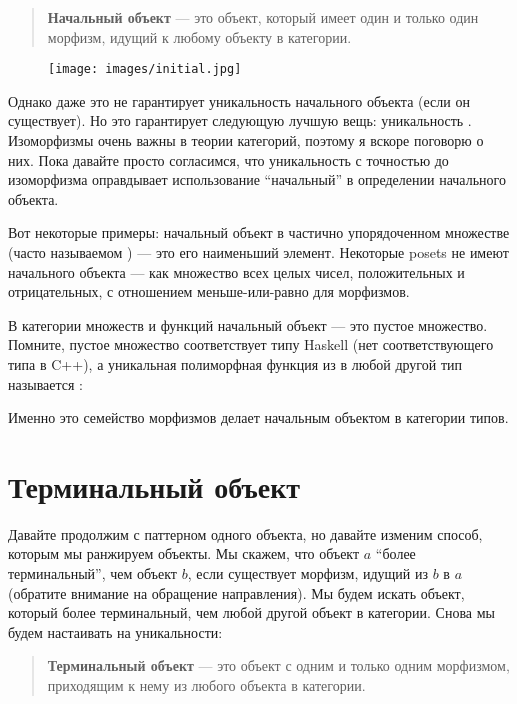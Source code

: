 \begin{quote}
  \textbf{Начальный объект} --- это объект, который имеет один и только один
  морфизм, идущий к любому объекту в категории.
\end{quote}

\begin{figure}[H]
  \centering
  \texttt{[image: images/initial.jpg]}
\end{figure}

\noindent
Однако даже это не гарантирует уникальность начального
объекта (если он существует). Но это гарантирует следующую лучшую вещь:
уникальность . Изоморфизмы очень важны в
теории категорий, поэтому я вскоре поговорю о них. Пока давайте просто
согласимся, что уникальность с точностью до изоморфизма оправдывает использование ``начальный'' в
определении начального объекта.

Вот некоторые примеры: начальный объект в частично упорядоченном множестве
(часто называемом ) --- это его наименьший элемент. Некоторые posets не
имеют начального объекта --- как множество всех целых чисел, положительных и
отрицательных, с отношением меньше-или-равно для морфизмов.

В категории множеств и функций начальный объект --- это пустое
множество. Помните, пустое множество соответствует типу Haskell
 (нет соответствующего типа в C++), а уникальная
полиморфная функция из  в любой другой тип называется
:

Именно это семейство морфизмов делает  начальным
объектом в категории типов.

\section{Терминальный объект}

Давайте продолжим с паттерном одного объекта, но давайте изменим способ,
которым мы ранжируем объекты. Мы скажем, что объект $a$ ``более терминальный'',
чем объект $b$, если существует морфизм, идущий из $b$ в
$a$ (обратите внимание на обращение направления). Мы будем искать
объект, который более терминальный, чем любой другой объект в категории.
Снова мы будем настаивать на уникальности:

\begin{quote}
  \textbf{Терминальный объект} --- это объект с одним и только одним
  морфизмом, приходящим к нему из любого объекта в категории.
\end{quote}

